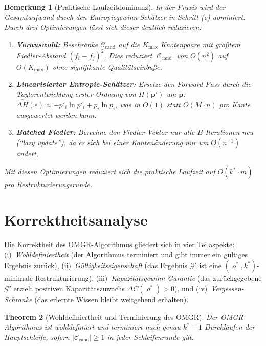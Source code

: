 ﻿\documentclass[12pt, a4paper, openany]{report}
\newtheorem{theorem}{Theorem}[chapter]
\newtheorem{remark}[theorem]{Bemerkung}
\newcommand{\calG}{\mathcal{G}}
\newcommand{\calC}{\mathcal{C}}
\begin{document}
\begin{remark}[Praktische Laufzeitdominanz]
\label{rem:runtime_practical}
In der Praxis wird der Gesamtaufwand durch den Entropiegewinn-Schätzer in
Schritt (c) dominiert.  Durch drei Optimierungen lässt sich dieser
deutlich reduzieren:
\begin{enumerate}[label=(\roman*)]
  \item \textbf{Vorauswahl:} Beschränke $\calC_{\mathrm{cand}}$ auf die
    $K_{\max}$ Knotenpaare mit größtem Fiedler-Abstand $(f_i - f_j)^2$.
    Dies reduziert $|\calC_{\mathrm{cand}}|$ von $O(n^2)$ auf $O(K_{\max})$
    ohne signifikante Qualitätseinbuße.
  \item \textbf{Linearisierter Entropie-Schätzer:} Ersetze den Forward-Pass
    durch die Taylorentwicklung erster Ordnung von $H(\bm{p}')$ um $\bm{p}$:
    $\widehat{\Delta H}(e) \approx -p'_i \ln p'_i + p_i \ln p_i$,
    was in $O(1)$ statt $O(M \cdot n)$ pro Kante ausgewertet werden kann.
  \item \textbf{Batched Fiedler:} Berechne den Fiedler-Vektor nur alle
    $B$ Iterationen neu (``lazy update''), da er sich bei einer
    Kantenänderung nur um $O(n^{-1})$ ändert.
\end{enumerate}
Mit diesen Optimierungen reduziert sich die praktische Laufzeit auf
$O(k^* \cdot m)$ pro Restrukturierungsrunde.
\end{remark}

\section{Korrektheitsanalyse}
\label{sec:algo_correctness}

Die Korrektheit des OMGR-Algorithmus gliedert sich in vier Teilaspekte:
(i)~\emph{Wohldefiniertheit} (der Algorithmus terminiert und gibt immer
ein gültiges Ergebnis zurück), (ii)~\emph{Gültigkeitseigenschaft}
(das Ergebnis $\calG'$ ist eine $(\varrho^*, k^*)$-minimale Restrukturierung),
(iii)~\emph{Kapazitätsgewinn-Garantie} (das zurückgegebene $\calG'$
erzielt positiven Kapazitätszuwachs $\Delta C(\varrho^*) > 0$), und
(iv)~\emph{Vergessen-Schranke} (das erlernte Wissen bleibt weitgehend
erhalten).

\begin{theorem}[Wohldefiniertheit und Terminierung des OMGR]
\label{thm:omgr_welldefined}
Der OMGR-Algorithmus ist wohldefiniert und terminiert nach
genau $k^* + 1$ Durchläufen der Hauptschleife, sofern
$|\calC_{\mathrm{cand}}| \geq 1$ in jeder Schleifenrunde gilt.
\end{theorem}
\end{document}
